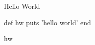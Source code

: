 \documentclass{article}
\begin{document}
Hello World

\begin{rbtex}

    def hw
        puts 'hello world'
    end

    hw
\end{rbtex}
\end{document}
